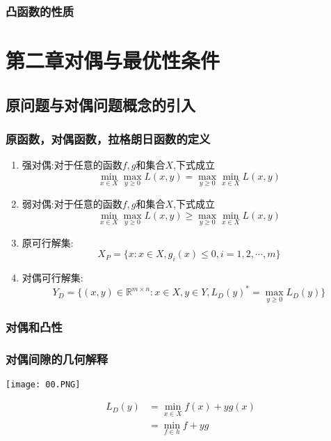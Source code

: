\documentclass[UTF8]{article}
\begin{document}
		\subsubsection{凸函数的性质}
\section{第二章\quad 对偶与最优性条件}

\subsection{原问题与对偶问题概念的引入}
	
		\subsubsection{原函数，对偶函数，拉格朗日函数的定义}
			\begin{enumerate}
				\item 强对偶:对于任意的函数$f,g$和集合$X$,下式成立
				\[\min\limits _{x\in X} \max\limits_{y\geq 0}L(x,y) = \max\limits_{y\geq0}\min\limits_{x\in X}L(x,y)\]
				\item 弱对偶:对于任意的函数$f,g$和集合$X$,下式成立
				\[\min\limits _{x\in X} \max\limits_{y\geq 0}L(x,y) \geq\max\limits_{y\geq0}\min\limits_{x\in X}L(x,y)\]
				\item 原可行解集:\\
				\[ X_{P} = \{x:x\in X,g_{i}(x)\leq 0,i=1,2,\cdots,m\}\]
				\item 对偶可行解集:\\
				\[Y_{D} = \{(x,y) \in \mathbb{R}^{m \times n}:x \in X,y\in Y,L_{D}(y)^{*} = \max\limits_{y \geq 0}L_{D}(y)\}\]
			\end{enumerate}
		\subsubsection{对偶和凸性}
		\subsubsection{对偶间隙的几何解释}
	\begin{center}
		\texttt{[image: 00.PNG]}
		\end{center}
	
	\begin{displaymath}
	\begin{aligned}
	 L_D(y) & =   \min\limits_{x\in X} f(x)+yg(x)\\
	& =\min\limits_{ f \in h} f+ yg
	\end{aligned} 
	\end{displaymath}
	
\end{document}

